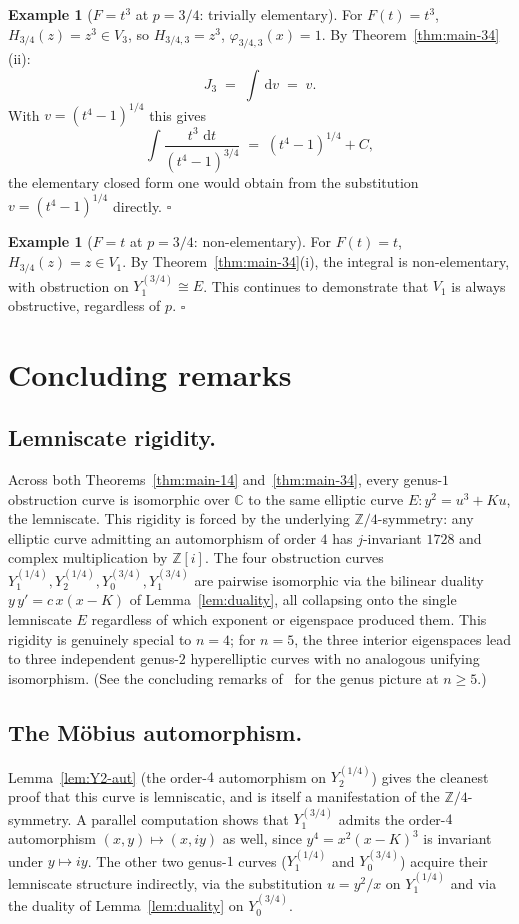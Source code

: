 \documentclass[11pt,a4paper]{article}
\theoremstyle{plain}
\theoremstyle{definition}
\newtheorem{example}[theorem]{Example}
\theoremstyle{remark}
\newcommand{\C}{\mathbb{C}}
\newcommand{\Z}{\mathbb{Z}}
\renewcommand{\d}{\,\mathrm{d}}
\begin{document}
\begin{example}[$F = t^3$ at $p = 3/4$: trivially elementary]\label{ex:Ft3-34}
For $F(t) = t^3$, $H_{3/4}(z) = z^3 \in V_3$, so $H_{3/4, 3} = z^3$, $\varphi_{3/4, 3}(x) = 1$. By Theorem~\ref{thm:main-34}(ii):
\[
  J_3 \;=\; \int \d v \;=\; v.
\]
With $v = (t^4 - 1)^{1/4}$ this gives
\[
  \int \frac{t^3\,\d t}{(t^4 - 1)^{3/4}} \;=\; (t^4 - 1)^{1/4} + C,
\]
the elementary closed form one would obtain from the substitution $v = (t^4 - 1)^{1/4}$ directly. \hfill$\square$
\end{example}

\begin{example}[$F = t$ at $p = 3/4$: non-elementary]\label{ex:Ft-34}
For $F(t) = t$, $H_{3/4}(z) = z \in V_1$. By Theorem~\ref{thm:main-34}(i), the integral is non-elementary, with obstruction on $Y_1^{(3/4)} \cong E$. This continues to demonstrate that $V_1$ is always obstructive, regardless of $p$. \hfill$\square$
\end{example}

\section{Concluding remarks}\label{sec:concluding}

\subsection*{Lemniscate rigidity.}
Across both Theorems~\ref{thm:main-14} and~\ref{thm:main-34}, every genus-$1$ obstruction curve is isomorphic over $\C$ to the same elliptic curve $E\colon y^2 = u^3 + K u$, the lemniscate. This rigidity is forced by the underlying $\Z/4$-symmetry: any elliptic curve admitting an automorphism of order $4$ has $j$-invariant $1728$ and complex multiplication by $\Z[i]$. The four obstruction curves $Y_1^{(1/4)}, Y_2^{(1/4)}, Y_0^{(3/4)}, Y_1^{(3/4)}$ are pairwise isomorphic via the bilinear duality $y\,y' = c\,x(x-K)$ of Lemma~\ref{lem:duality}, all collapsing onto the single lemniscate $E$ regardless of which exponent or eigenspace produced them. This rigidity is genuinely special to $n = 4$; for $n = 5$, the three interior eigenspaces lead to three independent genus-$2$ hyperelliptic curves with no analogous unifying isomorphism. (See the concluding remarks of~\cite{GoursatCubic} for the genus picture at $n \geq 5$.)

\subsection*{The Möbius automorphism.}
Lemma~\ref{lem:Y2-aut} (the order-$4$ automorphism on $Y_2^{(1/4)}$) gives the cleanest proof that this curve is lemniscatic, and is itself a manifestation of the $\Z/4$-symmetry. A parallel computation shows that $Y_1^{(3/4)}$ admits the order-$4$ automorphism $(x, y) \mapsto (x, iy)$ as well, since $y^4 = x^2(x-K)^3$ is invariant under $y \mapsto iy$. The other two genus-$1$ curves ($Y_1^{(1/4)}$ and $Y_0^{(3/4)}$) acquire their lemniscate structure indirectly, via the substitution $u = y^2/x$ on $Y_1^{(1/4)}$ and via the duality of Lemma~\ref{lem:duality} on $Y_0^{(3/4)}$.
\end{document}
